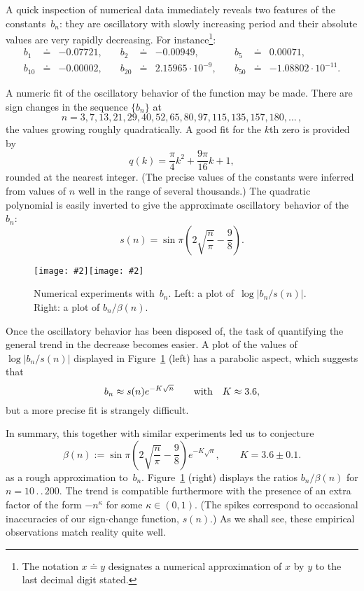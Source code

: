 \documentclass{amsart}
\newcommand{\Img}[2]{\texttt{[image: \#2]}}
\begin{document}
A quick inspection of numerical data immediately reveals two features
of the constants~$b_n$: they are oscillatory with slowly increasing
period and their
absolute values are very rapidly decreasing. For instance\footnote{%
	The notation $x\doteq y$ designates a numerical approximation of
	$x$ by $y$ to the last decimal digit stated. 
}:
\[\renewcommand{\arraycolsep}{2truept}
\begin{array}{lllllllll}
b_1&\doteq&-	0.07721,\quad &
b_2&\doteq&-	0.00949,\quad &
b_5&\doteq& 	0.00071, \\
b_{10}&\doteq&-	0.00002, \quad &
b_{20}&\doteq& 	2.15965\cdot 10^{-9},\quad &
b_{50}&\doteq&-	1.08802\cdot 10^{-11}.
\end{array}\]

A numeric fit of the oscillatory behavior of the function may be made.
There are sign changes in the sequence $\{b_n\}$ at
\[
n=3,7,13,21,29,40,52,65,80,97,115,135,157,180,\ldots\,,
\]
the values growing roughly quadratically. A good fit for the $k$th zero is
provided by
\[
q(k)= \frac{\pi}{4}k^2+\frac{9\pi}{16}k+1,\]
rounded at the  nearest integer. (The precise values of the constants were inferred from
values of $n$ well in the range of several thousands.)
The quadratic polynomial is easily 
inverted to give the approximate oscillatory behavior of the $b_n$:
\[
s(n) = \sin\pi\left(2\sqrt{\frac{n}{\pi}}-\frac{9}{8}\right).\]

\begin{figure}

\begin{center}
\hbox{\Img{6}{exper1.jpg}\Img{6}{exper2.jpg}}
\end{center}

\caption{\label{exper-fig}
Numerical experiments with~$b_n$. Left: a plot of~$\log|b_n/s(n)|$.
Right: a plot of $b_n/\beta(n)$.}
\end{figure}
Once the oscillatory behavior has been disposed of, the task of quantifying
the general trend in the decrease becomes easier. A plot of the values 
of $\log|b_n/s(n)|$ displayed in Figure~\ref{exper-fig} (left)
has a parabolic aspect, which suggests that
\[
b_n \approx s(n) e^{-K\sqrt{n}} \qquad \hbox{with}\quad K\approx 3.6,\]
but a more precise fit  is strangely difficult. 

In summary, this together with similar experiments led us to conjecture 
\begin{equation}\label{conj}
\beta(n):=  \sin\pi\left(2\sqrt{\frac{n}{\pi}}-\frac{9}{8}\right)  e^{-K\sqrt{n}},
\qquad K=3.6\pm 0.1.
\end{equation}
as  a   rough approximation  to~$b_n$.  Figure~\ref{exper-fig} (right)
displays the ratios $b_n/\beta(n)$  for $n=10\,.\,.\,200$.   The trend  is
compatible furthermore with the presence  of
an   extra   factor   of     the  form   $-n^\kappa$   for   some
$\kappa\in(0,1)$. (The spikes
correspond  to    occasional inaccuracies  of  our sign-change function,    $s(n)$.) 
As we shall see, these empirical observations match reality quite well.
\end{document}
